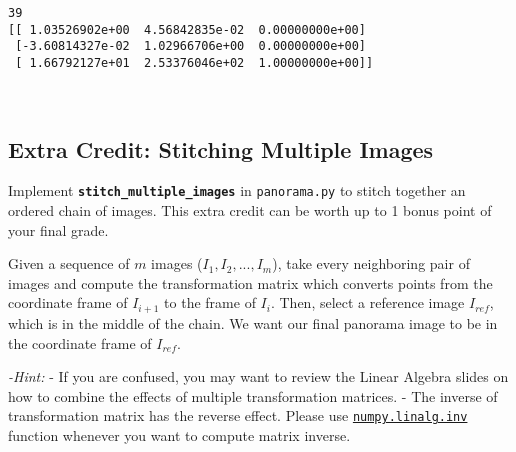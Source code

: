 \documentclass[11pt]{article}
\begin{document}
    \begin{Verbatim}[commandchars=\\\{\}]
39
[[ 1.03526902e+00  4.56842835e-02  0.00000000e+00]
 [-3.60814327e-02  1.02966706e+00  0.00000000e+00]
 [ 1.66792127e+01  2.53376046e+02  1.00000000e+00]]

    \end{Verbatim}

    \begin{center}
    \end{center}
    { \hspace*{\fill} \\}
    
    \subsection{Extra Credit: Stitching Multiple
Images}\label{extra-credit-stitching-multiple-images}

Implement \textbf{\texttt{stitch\_multiple\_images}} in
\texttt{panorama.py} to stitch together an ordered chain of images. This
extra credit can be worth up to 1 bonus point of your final grade.

Given a sequence of \(m\) images (\(I_1, I_2,...,I_m\)), take every
neighboring pair of images and compute the transformation matrix which
converts points from the coordinate frame of \(I_{i+1}\) to the frame of
\(I_{i}\). Then, select a reference image \(I_{ref}\), which is in the
middle of the chain. We want our final panorama image to be in the
coordinate frame of \(I_{ref}\).

\emph{-Hint:} - If you are confused, you may want to review the Linear
Algebra slides on how to combine the effects of multiple transformation
matrices. - The inverse of transformation matrix has the reverse effect.
Please use
\href{https://docs.scipy.org/doc/numpy/reference/generated/numpy.linalg.inv.html}{\texttt{numpy.linalg.inv}}
function whenever you want to compute matrix inverse.
\end{document}
